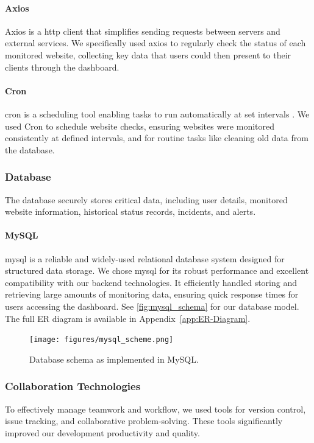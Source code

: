 \paragraph{Axios}
Axios is a \acrshort{http} client that simplifies sending requests between servers and external services. We specifically used \gls{axios} to regularly check the status of each monitored website, collecting key data that users could then present to their clients through the dashboard.

\paragraph{Cron}
\gls{cron} is a scheduling tool enabling tasks to run automatically at set intervals \cite{cron}. We used Cron to schedule website checks, ensuring websites were monitored consistently at defined intervals, and for routine tasks like cleaning old data from the database.

\subsubsection{Database}
The \gls{database} securely stores critical data, including user details, monitored website information, historical status records, incidents, and alerts.

\paragraph{MySQL}
\gls{mysql} is a reliable and widely-used relational database system designed for structured data storage. We chose \gls{mysql} for its robust performance and excellent compatibility with our \gls{backend} technologies. It efficiently handled storing and retrieving large amounts of monitoring data, ensuring quick response times for users accessing the dashboard. See \autoref{fig:mysql_schema} for our database model. The full ER diagram is available in Appendix~\ref{app:ER-Diagram}.

\begin{figure}[H]
    \centering
    \texttt{[image: figures/mysql\_scheme.png]}
    \caption{Database schema as implemented in MySQL.}
    \label{fig:mysql_schema}
\end{figure}

\subsubsection{Collaboration Technologies}
\label{subsubsec:collab_tech}
To effectively manage teamwork and workflow, we used tools for version control, issue tracking, and collaborative problem-solving. These tools significantly improved our development productivity and quality.

